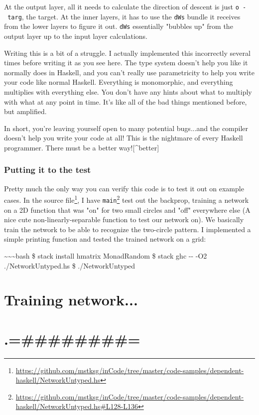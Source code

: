\documentclass[]{article}
\renewcommand{\href}[2]{#2\footnote{\url{#1}}}
\begin{document}
At the output layer, all it needs to calculate the direction of descent is just
\texttt{o\ -\ targ}, the target. At the inner layers, it has to use the
\texttt{dWs} bundle it receives from the lower layers to figure it out.
\texttt{dWs} essentially "bubbles up" from the output layer up to the input
layer calculations.

Writing this is a bit of a struggle. I actually implemented this incorrectly
several times before writing it as you see here. The type system doesn't help
you like it normally does in Haskell, and you can't really use parametricity to
help you write your code like normal Haskell. Everything is monomorphic, and
everything multiplies with everything else. You don't have any hints about what
to multiply with what at any point in time. It's like all of the bad things
mentioned before, but amplified.

In short, you're leaving yourself open to many potential bugs...and the compiler
doesn't help you write your code at all! This is the nightmare of every Haskell
programmer. There must be a better way!{[}\^{}better{]}

\subsubsection{Putting it to the test}

Pretty much the only way you can verify this code is to test it out on example
cases. In the
\href{https://github.com/mstksg/inCode/tree/master/code-samples/dependent-haskell/NetworkUntyped.hs}{source
file}, I have
\href{https://github.com/mstksg/inCode/tree/master/code-samples/dependent-haskell/NetworkUntyped.hs\#L128-L136}{\texttt{main}}
test out the backprop, training a network on a 2D function that was "on" for two
small circles and "off" everywhere else (A nice cute non-linearly-separable
function to test our network on). We basically train the network to be able to
recognize the two-circle pattern. I implemented a simple printing function and
tested the trained network on a grid:

\textasciitilde{}\textasciitilde{}\textasciitilde{}bash \$ stack install hmatrix
MonadRandom \$ stack ghc -\/- -O2 ./NetworkUntyped.hs \$ ./NetworkUntyped

\section{Training network...}

\section{.=\#\#\#\#\#\#\#\#=}
\end{document}
